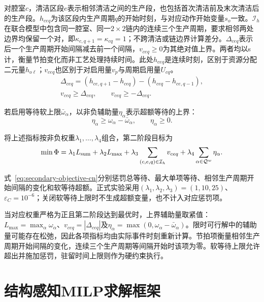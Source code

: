 \documentclass[final,5p,times,twocolumn]{elsarticle}
\begin{document}
对腔室$c$，清洁区段$e$表示相邻清洁之间的生产段，也包括首次清洁前及末次清洁后的生产段。$h_{ceq}$为该区段内生产周期$q$的开始时刻，与对应动作开始变量$s_o$一致。$\mathcal I_h$在联合模型中包含同一腔室、同一$2\times2$链内的连续三个生产周期，要求相邻两处边界均保留一个对，即$\kappa_{c,q+1}=\kappa_{cq}=1$；不跨清洁或链边界计算差分。$\Delta_{ceq}$表示后一个生产周期开始间隔减去前一个间隔，$v_{ceq}\ge0$为其绝对值上界。两者均以s计，衡量节拍变化而非工艺处理持续时间。此处$h_{ceq}$是连续时刻，区别于资源分配二元量$h_{o\ell}$；$v_{ceq}$也区别于对启用量$v_p$与周期启用量$U_{cq}$。
\begin{equation}
\begin{gathered}
\Delta_{ceq}=(h_{ce,q+1}-h_{ceq})-(h_{ceq}-h_{ce,q-1}),\\
v_{ceq}\ge\Delta_{ceq},\qquad v_{ceq}\ge-\Delta_{ceq}.
\end{gathered}
\label{eq:secondary-rhythm-cn}
\end{equation}

若启用等待软上限$\bar\omega_\alpha$，以非负辅助量$\eta_\alpha$表示超额等待的上界：
\begin{equation}
\eta_\alpha\ge\omega_\alpha-\bar\omega_\alpha,\qquad
\eta_\alpha\ge0.
\label{eq:secondary-softwait-cn}
\end{equation}

将上述指标按非负权重$\lambda_1,\ldots,\lambda_4$组合，第二阶段目标为
\begin{equation}
\begin{gathered}
\min\Phi=\lambda_1L_{\rm sum}+\lambda_2L_{\max}
+\lambda_3\sum_{(c,e,q)\in\mathcal I_h}v_{ceq}
+\lambda_4\sum_{\alpha\in\mathcal Q^w}\eta_\alpha.
\end{gathered}
\label{eq:secondary-objective-cn}
\end{equation}

式~\eqref{eq:secondary-objective-cn}分别惩罚总等待、最大单项等待、相邻生产周期开始间隔的变化和软等待超额。正式实验采用$(\lambda_1,\lambda_2,\lambda_3)=(1,10,25)$、$\varepsilon_C=10^{-6}$；关闭软等待上限时不生成超额变量，也不计入对应惩罚项。

当对应权重严格为正且第二阶段达到最优时，上界辅助量取紧值：$L_{\max}=\max_\alpha\omega_\alpha$、$v_{ceq}=|\Delta_{ceq}|$及$\eta_\alpha=\max(0,\omega_\alpha-\bar\omega_\alpha)$。限时可行解中的辅助量可能存在松弛，因此各项指标均由实际事件时刻重新计算。节拍项衡量相邻生产周期开始间隔的变化，连续三个生产周期等间隔开始时该项为零。软等待上限允许超出并施加惩罚，驻留时间上限则作为硬约束执行。

\section{结构感知MILP求解框架}
\end{document}
